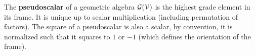 \begin{definition}[Pseudoscalar]
	The \textbf{pseudoscalar} of a geometric algebra $\mathcal{G}(\mathcal{V})$ is the highest grade element in its frame. It is unique up to scalar multiplication (including permutation of factors).
	The square of a pseudoscalar is also a scalar, by convention, it is normalized such that it squares to $1$ or $-1$ (which defines the orientation of the frame).
\end{definition}
